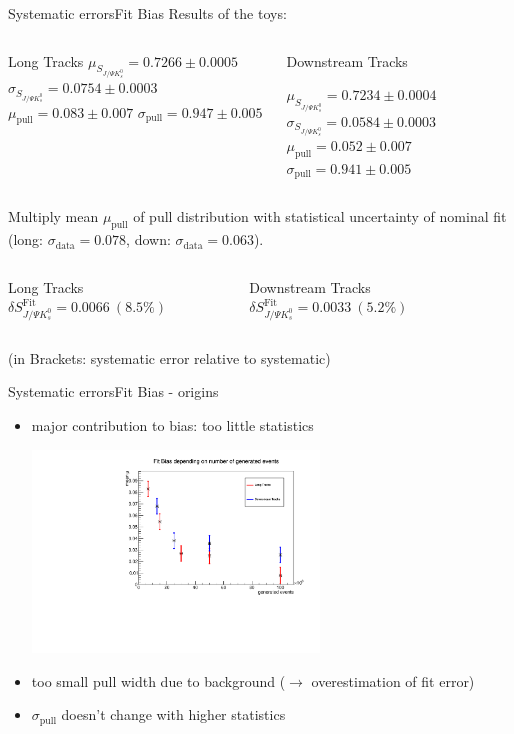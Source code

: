 \documentclass{beamer}
\newcommand{\SJPsi}{S_{J/\Psi K_s^0}}
\begin{document}
	\begin{frame}{Systematic errors}{Fit Bias}
	Results of the toys:
	\begin{columns}
	\begin{block}{Long Tracks}
        $\mu_{\SJPsi} = 0.7266 \pm 0.0005$
        $\sigma_{\SJPsi} = 0.0754 \pm 0.0003$
        $\mu_{\text{pull}} = 0.083 \pm 0.007$
        $\sigma_{\text{pull}} = 0.947 \pm 0.005$
    \end{block}
	\begin{block}{Downstream Tracks}
    
        $\mu_{\SJPsi} = 0.7234 \pm 0.0004$
        $\sigma_{\SJPsi} = 0.0584 \pm 0.0003$
        $\mu_{\text{pull}} = 0.052 \pm 0.007$
        $\sigma_{\text{pull}} = 0.941 \pm 0.005$
    \end{block}
    \end{columns}
	\vspace{0.5cm} 
	Multiply mean $\mu_{\text{pull}}$ of pull distribution with statistical uncertainty of nominal fit (long: $\sigma_{\text{data}}=0.078$, down: $\sigma_{\text{data}}=0.063$).
	\begin{columns}
	\column{0.5\textwidth}
	\begin{block}{Long Tracks}
    \centering
        $\delta\SJPsi^{\text{Fit}} = 0.0066\ (8.5\%)$
    \end{block}
    	\column{0.5\textwidth}
	\begin{block}{Downstream Tracks}
    \centering
        $\delta\SJPsi^{\text{Fit}} = 0.0033\ (5.2\%)$
    \end{block}
    \end{columns}
    \vspace{0.5cm}
    (in Brackets: systematic error relative to systematic)
    \end{frame}
	
	\begin{frame}{Systematic errors}{Fit Bias - origins}
    \begin{itemize}
      \item major contribution to bias: too little statistics
      \begin{center}
    \includegraphics[width = 0.6\textwidth]{fit_bias_statistics}
    \end{center}
    \item too small pull width due to background ($\rightarrow$ overestimation of fit error)
    \item $\sigma_{\text{pull}}$ doesn't change with higher statistics
    \end{itemize}
    
    \end{frame}
	
\end{document}
